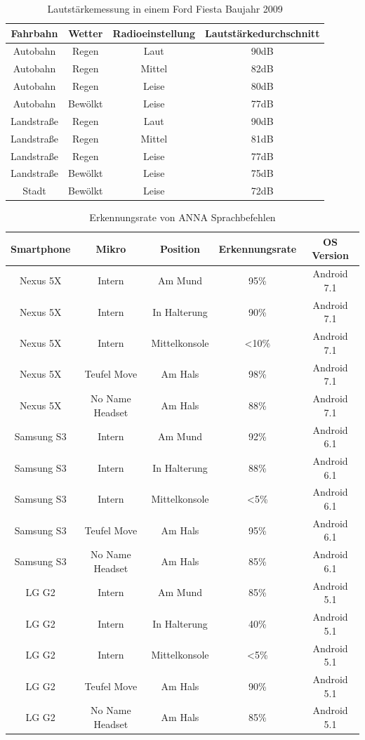 \begin{table}[h]
\centering
\begin{tabular}{ |c|c|c|c| } 
 \hline
 Fahrbahn & Wetter & Radioeinstellung & Lautstärkedurchschnitt\\
 \hline
 Autobahn & Regen & Laut & 90dB\\
 Autobahn & Regen & Mittel & 82dB\\
 Autobahn & Regen & Leise & 80dB\\
 Autobahn & Bewölkt & Leise & 77dB\\
 Landstraße & Regen & Laut & 90dB\\
 Landstraße & Regen & Mittel & 81dB\\
 Landstraße & Regen & Leise & 77dB\\
 Landstraße & Bewölkt & Leise & 75dB\\
 Stadt & Bewölkt & Leise & 72dB\\
 \hline
\end{tabular}
\caption{Lautstärkemessung in einem Ford Fiesta Baujahr 2009 }
\label{tabLautMessungFahrt}
\end{table}

\begin{table}[h]
\centering
\begin{tabular}{ |c|c|c|c|c| } 
 \hline
 Smartphone & Mikro & Position & Erkennungsrate & OS Version\\
 \hline
 Nexus 5X & Intern & Am Mund & 95\% & Android 7.1\\
 Nexus 5X & Intern & In Halterung & 90\% & Android 7.1\\
 Nexus 5X & Intern & Mittelkonsole & <10\% & Android 7.1\\
 Nexus 5X & Teufel Move & Am Hals & 98\% & Android 7.1\\
 Nexus 5X & No Name Headset & Am Hals & 88\% & Android 7.1\\

 Samsung S3 & Intern & Am Mund & 92\% & Android 6.1\\
 Samsung S3 & Intern & In Halterung & 88\% & Android 6.1\\
 Samsung S3 & Intern & Mittelkonsole & <5\% & Android 6.1\\
 Samsung S3 & Teufel Move & Am Hals & 95\% & Android 6.1\\
 Samsung S3 & No Name Headset & Am Hals & 85\% & Android 6.1\\

 LG G2 & Intern & Am Mund & 85\% & Android 5.1\\
 LG G2 & Intern & In Halterung & 40\% & Android 5.1\\
 LG G2 & Intern & Mittelkonsole & <5\% & Android 5.1\\
 LG G2 & Teufel Move & Am Hals & 90\% & Android 5.1\\
 LG G2 & No Name Headset & Am Hals & 85\% & Android 5.1\\

 \hline
\end{tabular}
\caption{Erkennungsrate von \ac{ANNA} Sprachbefehlen}
\label{tabErkennungsrate}
\end{table}

